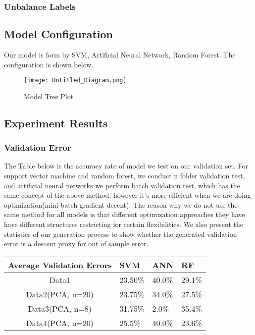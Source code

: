 {\subsubsection{Unbalance Labels}

\subsection{Model Configuration}
Our model is form by SVM, Artificial Neural Network, Random Forest. The configuration is shown below.

\begin{figure}
\caption{Model Tree Plot}
\centering
\texttt{[image: Untitled\_Diagram.png]}
\label{fig:my_label}
\end{figure}


\subsection{Experiment Results}

\subsubsection{Validation Error}

    The Table below is the accuracy rate of model we test on our validation set.
    For support vector machine and  random forest, we conduct n folder validation test, and artificial neural networks we perform batch validation test, which has the same concept of the above method, however it's more efficient when we are doing optimization(mini-batch gradient decent). The reason why we do not use the same method for all models is that different optimization approaches they have have different structures restricting for certain flexibilities. 
    We also present the statistics of our generation process to show whether the generated validation error is a descent proxy for out of sample error.
    

\begin{table}[h]
\centering
\begin{tabular}{|c|l|l|l|}
\hline
\multicolumn{1}{|l|}{Average Validation Errors} & SVM     & ANN    & RF     \\ \hline
Data1                                                  & 23.50\% & 40.0\% & 29.1\% \\ \hline
Data2(PCA, n=20)                                       & 23.75\% & 34.0\% & 27.5\% \\ \hline
Data3(PCA, n=8)                                        & 31.75\% & 2.0\%  & 35.4\% \\ \hline
Data4(PCA, n=20)                                       & 25.5\%  & 40.0\% & 23.6\% \\ \hline
\end{tabular}


\end{table}}
